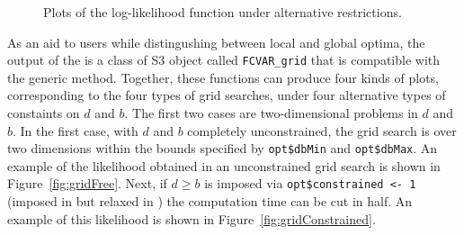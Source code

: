 \documentclass[article]{jss}
\newcommand{\fct}[1]{\code{#1()}}
\begin{document}
\begin{figure}[H]
{  } 
  \caption{Plots of the log-likelihood function under alternative restrictions.}
  \label{fig:LikeGrid}
\end{figure}


As an aid to users while distingushing between local and global optima, 
the output of the \fct{FCVARlikeGrid} is a class of S3 object called \texttt{FCVAR\_grid} that 
is compatible with the generic \fct{plot} method. 
Together, these functions can produce four kinds of plots, corresponding to the four types of grid searches, 
under four alternative types of constaints on $d$ and $b$. 
The first two cases are two-dimensional problems in $d$ and $b$. 
% 
In the first case, with $d$ and $b$ completely unconstrained, the grid search is over two dimensions within the bounds specified by \verb|opt$dbMin| and \verb|opt$dbMax|. An example of the likelihood obtained in an unconstrained grid search is shown in Figure~\ref{fig:gridFree}. Next, if $d\ge b$ is imposed via \verb|opt$constrained <- 1| (imposed in \cite{johansen2012likelihood} but relaxed in \cite{JN2018}) the computation time can be cut in half. An example of this likelihood is shown in Figure~\ref{fig:gridConstrained}. 
\end{document}
